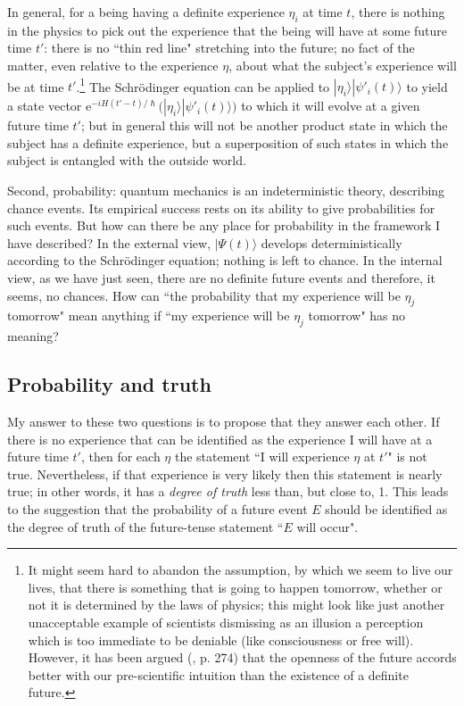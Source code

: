 \documentclass[12pt,a4paper,reqno]{article}
\renewcommand{\(}{\left(}
\renewcommand{\)}{\right)}
\newcommand{\e}{\mbox{e}}
\renewcommand{\hbar}{\hslash}
\newcommand{\<}{\langle}
\renewcommand{\>}{\rangle}
\theoremstyle{plain} %
\begin{document}
 In general, for a being having a definite experience $\eta_i$ at time $t$, there is nothing in the physics to pick out the experience that the being will have at some future time $t'$: there is no ``thin red line" stretching into the future; no fact of the matter, even relative to the experience $\eta$, about what the subject's experience will be at time $t'$.\footnote{It might seem hard to abandon the assumption, by which we seem to live our lives, that there is something that is going to happen tomorrow, whether or not it is determined by the laws of physics; this might look like just another unacceptable example of scientists dismissing as an illusion a perception which is too immediate to be deniable (like consciousness or free will). However, it has been argued (\cite{openfuture}, \cite{Wallace:multiverse} p. 274) that the openness of the future accords better with our pre-scientific intuition than the existence of a definite future.} The Schr\"odinger equation can be applied to $|\eta_i\>|\psi'_i(t)\>$ to yield a state vector $\e^{-iH(t'-t)/\hbar}\big(|\eta_i\>|\psi'_i(t)\>\big)$ to which it will evolve at a given future time $t'$; but in general this will not be another product state in which the subject has a definite experience, but a superposition of such states in which the subject is entangled with the outside world. 

Second, probability: quantum mechanics is an indeterministic theory, describing chance events. Its empirical success rests on its ability to give probabilities for such events. But how can there be any place for probability in the framework I have described? In the external view, $|\Psi(t)\>$ develops deterministically according to the Schr\"odinger equation; nothing is left to chance. In the internal view, as we have just seen, there are no definite future events and therefore, it seems, no chances. How can ``the probability that my experience will be $\eta_j$ tomorrow" mean anything if ``my experience will be $\eta_j$ tomorrow" has no meaning?

\subsection{Probability and truth}
\label{subsec:probtruth}
 
 My answer to these two questions is to propose that they answer each other. If there is no experience that can be identified as the experience I will have at a future time $t'$, then for each $\eta$ the statement ``I will experience $\eta$ at $t'$" is not true. Nevertheless, if that experience is very likely then this statement is nearly true; in other words, it has a \emph{degree of truth} less than, but close to, 1. This leads to the suggestion that the probability of a future event $E$ should be identified as the degree of truth of the future-tense statement ``$E$ will occur". 
 
\end{document}
